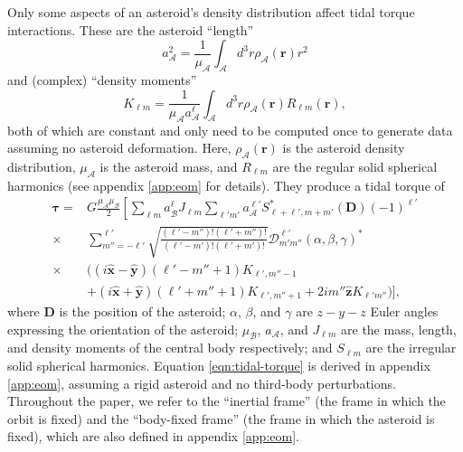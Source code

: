 \documentclass[fleqn,usenatbib]{mnras}
\newcommand{\unit}[1]{\bm{\hat{#1}}}
\begin{document}
Only some aspects of an asteroid's density distribution affect tidal torque interactions. These are the asteroid ``length'' 
\begin{equation}
  a_\mathcal{A}^2 = \frac{1}{\mu_\mathcal{A}} \int_\mathcal{A} d^3 r \rho_\mathcal{A}(\bm r) r^2
  \label{eqn:am}
\end{equation}
and (complex) ``density moments''
\begin{equation}
  K_{\ell m} = \frac{1}{\mu_\mathcal{A} a_\mathcal{A}^\ell} \int_\mathcal{A} d^3 r \rho_\mathcal{A}(\bm r) R_{\ell m}(\bm r),
  \label{eqn:klm}
\end{equation}
both of which are constant and only need to be computed once to generate data assuming no asteroid deformation. Here, $\rho_\mathcal{A}(\bm r)$ is the asteroid density distribution, $\mu_\mathcal{A}$ is the asteroid mass, and $R_{\ell m}$ are the regular solid spherical harmonics (see appendix \ref{app:eom} for details). They produce a tidal torque of 
\begin{equation}
  \begin{split}
  \bm \tau = & G\frac{\mu_\mathcal{A}\mu_\mathcal{B}}{2}\left[\sum_{\ell m} a_\mathcal{B}^\ell J_{\ell m} \sum_{\ell' m'}a_\mathcal{A}^{\ell'}S^*_{\ell+\ell', m + m'} (\bm D) (-1)^{\ell'}\right.\\
  \times & \left.\sum_{m''=-\ell'}^{\ell'} \sqrt{\frac{(\ell'-m'')!(\ell'+m'')!}{(\ell'-m')!(\ell'+m')!}}  \mathcal{D}^{\ell'}_{m'm''}(\alpha, \beta, \gamma)^* \right. \\
  \times & \Big((i\unit x - \unit y)(\ell'-m''+1)K_{\ell',m''-1} \\
  & +(i\unit x+\unit y)(\ell'+m''+1)K_{\ell',m''+1}+2im''\unit z K_{\ell'm''}\Big) \Bigg],
  \end{split}
  \label{eqn:tidal-torque}
\end{equation}
where $\bm D$ is the position of the asteroid; $\alpha$, $\beta$, and $\gamma$ are $z-y-z$ Euler angles expressing the orientation of the asteroid; $\mu_\mathcal{B}$, $a_\mathcal{A}$, and $J_{\ell m}$ are the mass, length, and density moments of the central body respectively; and $S_{\ell m}$ are the irregular solid spherical harmonics. Equation \ref{eqn:tidal-torque} is derived in appendix \ref{app:eom}, assuming a rigid asteroid and no third-body perturbations. Throughout the paper, we refer to the ``inertial frame'' (the frame in which the orbit is fixed) and the ``body-fixed frame'' (the frame in which the asteroid is fixed), which are also defined in appendix \ref{app:eom}.
\end{document}
